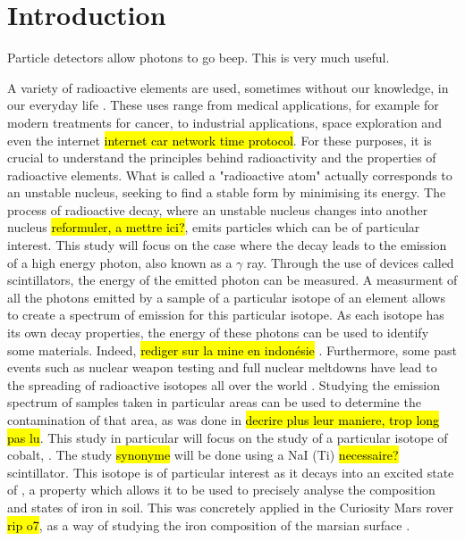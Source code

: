 \section{Introduction}
Particle detectors allow photons to go beep.
This is very much useful.

A variety of radioactive elements are used, sometimes without our knowledge, in our everyday life \cite{my_ass}.
These uses range from medical applications, for example for modern treatments for cancer, to industrial applications, space exploration and even the internet \hl{internet car network time protocol}.
For these purposes, it is crucial to understand the principles behind radioactivity and the properties of radioactive elements.
What is called a "radioactive atom" actually corresponds to an unstable nucleus, seeking to find a stable form by minimising its energy.
The process of radioactive decay, where an unstable nucleus changes into another nucleus \hl{reformuler, a mettre ici?}, emits particles which can be of particular interest.
This study will focus on the case where the decay leads to the emission of a high energy photon, also known as a \(\gamma\) ray.
Through the use of devices called scintillators, the energy of the emitted photon can be measured.
A measurment of all the photons emitted by a sample of a particular isotope of an element allows to create a spectrum of emission for this particular isotope.
As each isotope has its own decay properties, the energy of these photons can be used to identify some materials.
Indeed, \hl{rediger sur la mine en indonésie} \cite{ramadhany_assessment_2022}.
Furthermore, some past events such as nuclear weapon testing and full nuclear meltdowns have lead to the spreading of radioactive isotopes all over the world \cite{my_ass}.
Studying the emission spectrum of samples taken in particular areas can be used to determine the contamination of that area, as was done in \cite{varley_situ_2017} \hl{decrire plus leur maniere, trop long pas lu}.
This study in particular will focus on the study of a particular isotope of cobalt, \cobalt.
The study \hl{synonyme} will be done using a NaI (Ti) \hl{necessaire?} scintillator.
This isotope is of particular interest as it decays into an excited state of \iron, a property which allows it to be used to precisely analyse the composition and states of iron in soil.
This was concretely applied in the Curiosity Mars rover \hl{rip o7}, as a way of studying the iron composition of the marsian surface \cite{my_ass}.

